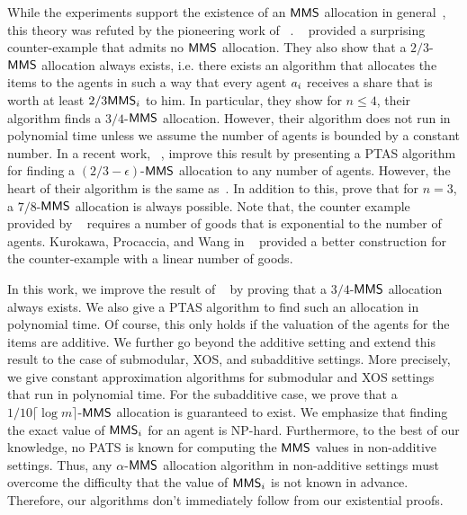 {%


While the experiments support the existence of an $\mathsf{MMS}$ allocation in general~\cite{Bouveret:first}, this theory was refuted by the pioneering work of \procacciafirst~\cite{Procaccia:first}. {\procacciafirst}~\cite{Procaccia:first} provided a surprising counter-example that admits no $\mathsf{MMS}$ allocation. They also show that a $2/3$-$\mathsf{MMS}$ allocation always exists, i.e. there exists an algorithm that allocates the items to the agents in such a way that every agent $a_i$ receives a share that is worth at least $2/3 \mathsf{MMS}_i$ to him.
 In particular, they show for $n \leq 4$, their algorithm finds a $3/4$-$\mathsf{MMS}$ allocation. However, their algorithm does not run in polynomial time unless we assume the number of agents is bounded by a constant number. In a recent work, \amanatidisapproximationful~\cite{amanatidis2015approximation}, improve this result by presenting a PTAS algorithm for finding a $(2/3 - \epsilon)$-$\mathsf{MMS}$ allocation to any number of agents. However, the heart of their algorithm is the same as~\cite{Procaccia:first}. In addition to this, \amanatidisapproximation\enspace prove that for $n=3$, a $7/8$-$\mathsf{MMS}$ allocation is always possible. Note that, the counter example provided by \procacciafirst~\cite{Procaccia:first}  requires a number of goods that is exponential to the number of agents. Kurokawa, Procaccia, and Wang in ~\cite{kurokawa2015can} provided a better construction for the counter-example with a linear number of goods. 


 In this work, we improve the result of \procacciafirst~\cite{Procaccia:first} by proving that a $3/4$-$\mathsf{MMS}$ allocation always exists. We also give a PTAS algorithm to find such an allocation in polynomial time. Of course, this only holds if the valuation of the agents for the items are additive. We further go beyond the additive setting and extend this result to the case of submodular, XOS, and subadditive settings. More precisely, we give constant approximation algorithms for submodular and XOS settings that run in polynomial time. For the subadditive case, we prove that a $1/10 \lceil\log m\rceil$-$\mathsf{MMS}$ allocation is guaranteed to exist. We emphasize that finding the exact value of $\mathsf{MMS}_i$ for an agent is NP-hard. Furthermore, to the best of our knowledge, no PATS is known for computing the  $\mathsf{MMS}$ values  in non-additive settings. Thus, any $\alpha$-$\mathsf{MMS}$ allocation algorithm in non-additive settings must overcome the difficulty that the value of $\mathsf{MMS}_i$ is not known in advance. Therefore, our algorithms don't immediately follow from our existential proofs.

}
